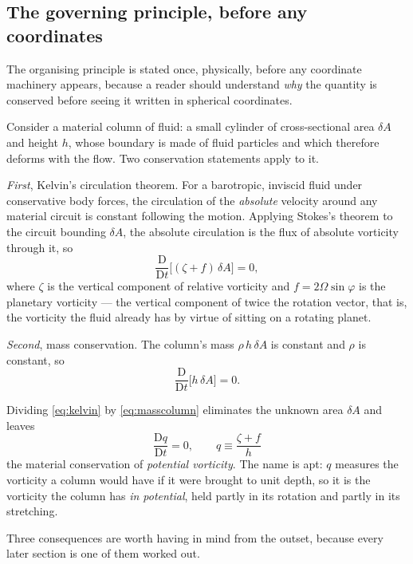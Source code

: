 \documentclass[11pt,a4paper]{article}
\newcommand{\D}{\mathrm{D}}
\begin{document}
\subsection{The governing principle, before any coordinates}

The organising principle is stated once, physically, before any coordinate
machinery appears, because a reader should understand \emph{why} the quantity is
conserved before seeing it written in spherical coordinates.

Consider a material column of fluid: a small cylinder of cross-sectional area
$\delta A$ and height $h$, whose boundary is made of fluid particles and which
therefore deforms with the flow. Two conservation statements apply to it.

\emph{First}, Kelvin's circulation theorem. For a barotropic, inviscid fluid
under conservative body forces, the circulation of the \emph{absolute} velocity
around any material circuit is constant following the motion. Applying Stokes's
theorem to the circuit bounding $\delta A$, the absolute circulation is the flux
of absolute vorticity through it, so
%
\begin{equation}
\frac{\D}{\D t}\Big[ (\zeta + f)\,\delta A \Big] = 0 ,
\label{eq:kelvin}
\end{equation}
%
where $\zeta$ is the vertical component of relative vorticity and
$f = 2\Omega\sin\varphi$ is the planetary vorticity --- the vertical component of
twice the rotation vector, that is, the vorticity the fluid already has by
virtue of sitting on a rotating planet.

\emph{Second}, mass conservation. The column's mass $\rho\, h\, \delta A$ is
constant and $\rho$ is constant, so
%
\begin{equation}
\frac{\D}{\D t}\Big[ h \,\delta A \Big] = 0 .
\label{eq:masscolumn}
\end{equation}

Dividing \eqref{eq:kelvin} by \eqref{eq:masscolumn} eliminates the unknown area
$\delta A$ and leaves
%
\begin{equation}
\boxed{\;\frac{\D q}{\D t} = 0 , \qquad q \equiv \frac{\zeta + f}{h}\;}
\label{eq:pv}
\end{equation}
%
the material conservation of \emph{potential vorticity}. The name is apt: $q$
measures the vorticity a column would have if it were brought to unit depth,
so it is the vorticity the column has \emph{in potential}, held partly in its
rotation and partly in its stretching.

Three consequences are worth having in mind from the outset, because every later
section is one of them worked out.
\end{document}
